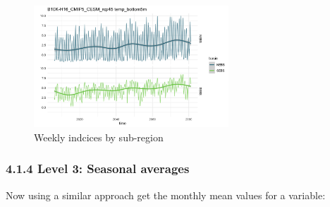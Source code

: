 \documentclass[
]{article}
\begin{document}
\begin{figure}
\centering
\includegraphics[width=0.65\textwidth,height=\textheight]{Figs/weekly_byreg.jpg}
\caption{Weekly indcices by sub-region}
\end{figure}

\hypertarget{level-3-seasonal-averages}{%
\subsubsection{4.1.4 Level 3: Seasonal
averages}\label{level-3-seasonal-averages}}

Now using a similar approach get the monthly mean values for a variable:
\end{document}
